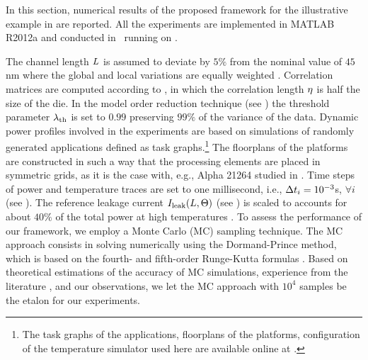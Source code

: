 In this section, numerical results of the proposed framework for the illustrative example in  are reported. All the experiments are implemented in MATLAB R2012a \cite{matlab} and conducted in \hostOS\ running on \hostHardware.

The channel length $L$ is assumed to deviate by $5\%$ from the nominal value of $45$ nm where the global and local variations are equally weighted \cite{juan2011, juan2012}. Correlation matrices are computed according to , in which the correlation length $\eta$ is half the size of the die. In the model order reduction technique (see ) the threshold parameter $\lambda_\text{th}$ is set to $0.99$ preserving $99\%$ of the variance of the data. Dynamic power profiles involved in the experiments are based on simulations of randomly generated applications defined as task graphs.\footnote{The task graphs of the applications, floorplans of the platforms, configuration of the temperature simulator used here are available online at \cite{sources}.} The floorplans of the platforms are constructed in such a way that the processing elements are placed in symmetric grids, as it is the case with, e.g., Alpha 21264 studied in \cite{juan2011}. Time steps of power and temperature traces are set to one millisecond, i.e., $\Delta t_i = 10^{-3}$s, $\forall i$ (see ). The reference leakage current $I_{\text{leak}}(L, \Theta)$ (see ) is scaled to accounts for about $40\%$ of the total power at high temperatures \cite{liu2007}. To assess the performance of our framework, we employ a Monte Carlo (MC) sampling technique. The MC approach consists in solving  numerically using the Dormand-Prince method, which is based on the fourth- and fifth-order Runge-Kutta formulas \cite{press2007}. Based on theoretical estimations \cite{diaz-emparanza2002} of the accuracy of MC simulations, experience from the literature \cite{xiu2010, maitre2010}, and our observations, we let the MC approach with $10^4$ samples be the etalon for our experiments.

